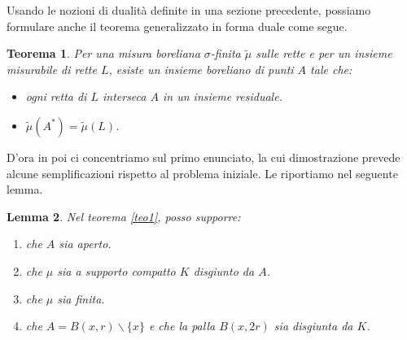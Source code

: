 \documentclass[a4paper, twoside]{article}
\newcommand{\<}{\langle}
\renewcommand{\>}{\rangle}
\newtheorem{teo}{Teorema}[]
\newtheorem{lemma}[teo]{Lemma}
\begin{document}
Usando le nozioni di dualità definite in una sezione precedente, possiamo formulare anche il teorema generalizzato in forma duale come segue.

\begin{teo}
	Per una misura boreliana $\sigma$-finita $\tilde \mu$ sulle rette e per un insieme misurabile di rette $L$, esiste un insieme boreliano di punti $A$ tale che:
	\begin{itemize}
		\item ogni retta di $L$ interseca $A$ in un insieme residuale.
		\item $\tilde \mu\left(A^{*}\right)=\tilde \mu(L)$.
	\end{itemize}
\end{teo}

D'ora in poi ci concentriamo sul primo enunciato, la cui dimostrazione prevede alcune semplificazioni rispetto al problema iniziale. Le riportiamo nel seguente lemma.

\begin{lemma} \label{Aaperto}
	Nel teorema \ref{teo1}, posso supporre: 
	\begin{enumerate}
		\item che $A$ sia aperto.
		\item che $\mu$ sia a supporto compatto $K$ disgiunto da $A$.
		\item che $\mu$ sia finita.
		\item che $A=B(x, r) \backslash\{x\}$ e che la palla $B(x, 2 r)$ sia disgiunta da $K$.
	\end{enumerate}	
\end{lemma}
\end{document}
